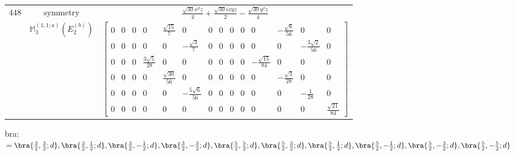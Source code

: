 \documentclass[fleqn,8pt,landscape]{jsarticle}
\begin{document}
\begin{longtable}{ccc}
$ 448 $ & $ \text{symmetry} $ & $ \frac{\sqrt{30} x^{2} z}{4} + \frac{\sqrt{30} i x y z}{2} - \frac{\sqrt{30} y^{2} z}{4} $ \\
$  $ & $ \mathbb{M}_{3}^{(1,1;a)}(E_{2}^{(b)}) $ & $ \begin{bmatrix} 0 & 0 & 0 & 0 & \frac{\sqrt{15}}{7} & 0 & 0 & 0 & 0 & 0 & 0 & - \frac{\sqrt{6}}{56} & 0 & 0 \\ 0 & 0 & 0 & 0 & 0 & - \frac{\sqrt{3}}{7} & 0 & 0 & 0 & 0 & 0 & 0 & - \frac{3 \sqrt{2}}{56} & 0 \\ 0 & 0 & 0 & \frac{3 \sqrt{5}}{28} & 0 & 0 & 0 & 0 & 0 & 0 & - \frac{\sqrt{15}}{84} & 0 & 0 & 0 \\ 0 & 0 & 0 & 0 & \frac{\sqrt{30}}{56} & 0 & 0 & 0 & 0 & 0 & 0 & - \frac{\sqrt{3}}{28} & 0 & 0 \\ 0 & 0 & 0 & 0 & 0 & - \frac{5 \sqrt{6}}{56} & 0 & 0 & 0 & 0 & 0 & 0 & - \frac{1}{28} & 0 \\ 0 & 0 & 0 & 0 & 0 & 0 & 0 & 0 & 0 & 0 & 0 & 0 & 0 & \frac{\sqrt{21}}{84} \end{bmatrix} $ \\ \hline
\end{longtable}
bra: $=\bra{\frac{3}{2},\frac{3}{2};d}, \bra{\frac{3}{2},\frac{1}{2};d}, \bra{\frac{3}{2},- \frac{1}{2};d}, \bra{\frac{3}{2},- \frac{3}{2};d}, \bra{\frac{5}{2},\frac{5}{2};d}, \bra{\frac{5}{2},\frac{3}{2};d}, \bra{\frac{5}{2},\frac{1}{2};d}, \bra{\frac{5}{2},- \frac{1}{2};d}, \bra{\frac{5}{2},- \frac{3}{2};d}, \bra{\frac{5}{2},- \frac{5}{2};d}$
\end{document}
